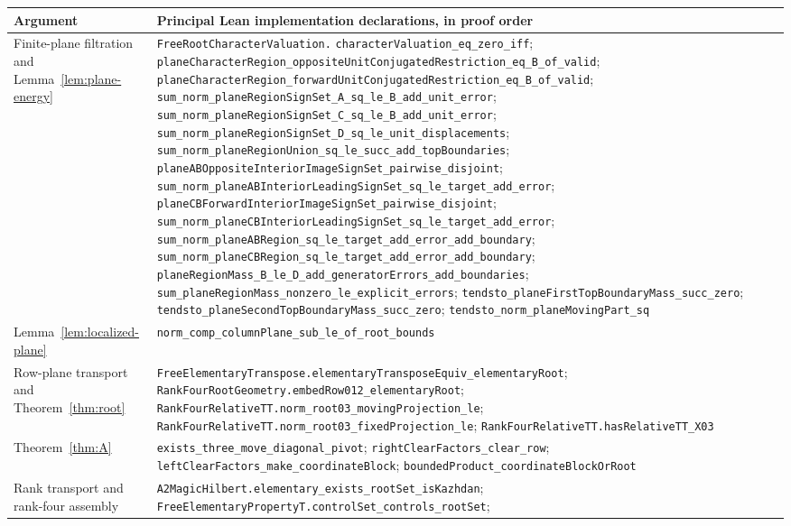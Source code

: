 \documentclass[11pt]{amsart}
\theoremstyle{definition}
\theoremstyle{plain}
\begin{document}
\medskip
\noindent
\begingroup
\scriptsize
\begin{tabularx}{\textwidth}{@{}>{\raggedright\arraybackslash}p{}>{\raggedright\arraybackslash}X@{}}
\toprule
Argument & Principal Lean implementation declarations, in proof order \\
\midrule
Finite-plane filtration and Lemma~\ref{lem:plane-energy} &
\nolinkurl{FreeRootCharacterValuation.}
\nolinkurl{characterValuation_eq_zero_iff};
\nolinkurl{planeCharacterRegion_oppositeUnitConjugatedRestriction_eq_B_of_valid};
\nolinkurl{planeCharacterRegion_forwardUnitConjugatedRestriction_eq_B_of_valid};
\nolinkurl{sum_norm_planeRegionSignSet_A_sq_le_B_add_unit_error};
\nolinkurl{sum_norm_planeRegionSignSet_C_sq_le_B_add_unit_error};
\nolinkurl{sum_norm_planeRegionSignSet_D_sq_le_unit_displacements};
\nolinkurl{sum_norm_planeRegionUnion_sq_le_succ_add_topBoundaries};
\nolinkurl{planeABOppositeInteriorImageSignSet_pairwise_disjoint};
\nolinkurl{sum_norm_planeABInteriorLeadingSignSet_sq_le_target_add_error};
\nolinkurl{planeCBForwardInteriorImageSignSet_pairwise_disjoint};
\nolinkurl{sum_norm_planeCBInteriorLeadingSignSet_sq_le_target_add_error};
\nolinkurl{sum_norm_planeABRegion_sq_le_target_add_error_add_boundary};
\nolinkurl{sum_norm_planeCBRegion_sq_le_target_add_error_add_boundary};
\nolinkurl{planeRegionMass_B_le_D_add_generatorErrors_add_boundaries};
\nolinkurl{sum_planeRegionMass_nonzero_le_explicit_errors};
\nolinkurl{tendsto_planeFirstTopBoundaryMass_succ_zero};
\nolinkurl{tendsto_planeSecondTopBoundaryMass_succ_zero};
\nolinkurl{tendsto_norm_planeMovingPart_sq} \\
Lemma~\ref{lem:localized-plane} &
\nolinkurl{norm_comp_columnPlane_sub_le_of_root_bounds} \\
Row-plane transport and Theorem~\ref{thm:root} &
\nolinkurl{FreeElementaryTranspose.elementaryTransposeEquiv_elementaryRoot};
\nolinkurl{RankFourRootGeometry.embedRow012_elementaryRoot};
\nolinkurl{RankFourRelativeTT.norm_root03_movingProjection_le};
\nolinkurl{RankFourRelativeTT.norm_root03_fixedProjection_le};
\nolinkurl{RankFourRelativeTT.hasRelativeTT_X03} \\
Theorem~\ref{thm:A} &
\nolinkurl{exists_three_move_diagonal_pivot};
\nolinkurl{rightClearFactors_clear_row};
\nolinkurl{leftClearFactors_make_coordinateBlock};
\nolinkurl{boundedProduct_coordinateBlockOrRoot} \\
Rank transport and rank-four assembly &
\nolinkurl{A2MagicHilbert.elementary_exists_rootSet_isKazhdan};
\nolinkurl{FreeElementaryPropertyT.controlSet_controls_rootSet};

\end{tabularx}
\end{document}
